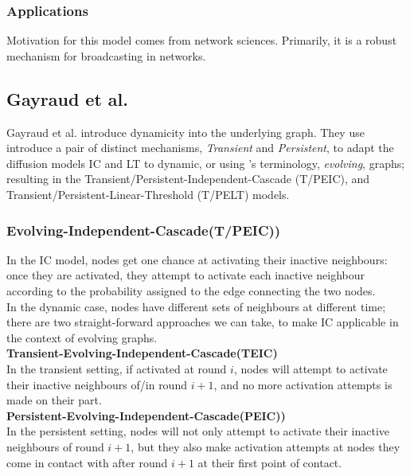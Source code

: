 \documentclass[twocolumn, 10pt]{article}
\begin{document}
\subsubsection{Applications}
Motivation for this model comes from network sciences. Primarily, it is a robust mechanism for broadcasting in networks.
\subsection{Gayraud et al. \cite{gay}}
Gayraud et al. introduce dynamicity into the underlying graph. They use introduce a pair of distinct mechanisms, \textit{Transient} and \textit{Persistent}, to adapt the diffusion models IC and LT to dynamic, or using \cite{gay}'s terminology, \textit{evolving}, graphs; resulting in the Transient/Persistent-Independent-Cascade (T/PEIC), and Transient/Persistent-Linear-Threshold (T/PELT) models.
\subsubsection{Evolving-Independent-Cascade(T/PEIC))}
In the IC model, nodes get one chance at activating their inactive neighbours: once they are activated, they attempt to activate each inactive neighbour according to the probability assigned to the edge connecting the two nodes. \\ 
In the dynamic case, nodes have different sets of neighbours at different time; there are two straight-forward approaches we can take, to make IC applicable in the context of evolving graphs. \\
\textbf{Transient-Evolving-Independent-Cascade(TEIC)} \\
In the transient setting, if activated at round $i$, nodes will attempt to activate their inactive neighbours of/in round $i+1$, and no more activation attempts is made on their part. \\
\textbf{Persistent-Evolving-Independent-Cascade(PEIC))} \\
In the persistent setting, nodes will not only attempt to activate their inactive neighbours of round $i+1$, but they also make activation attempts at nodes they come in contact with after round $i+1$ at their first point of contact.
\end{document}
